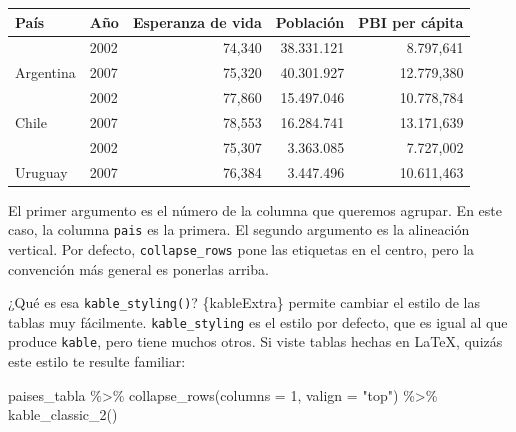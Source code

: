 \documentclass[
  openany]{book}
\newenvironment{Shaded}{\begin{snugshade}}{\end{snugshade}}
\newcommand{\AttributeTok}[1]{\textcolor[rgb]{0.77,0.63,0.00}{#1}}
\newcommand{\DecValTok}[1]{\textcolor[rgb]{0.00,0.00,0.81}{#1}}
\newcommand{\FunctionTok}[1]{\textcolor[rgb]{0.00,0.00,0.00}{#1}}
\newcommand{\NormalTok}[1]{#1}
\newcommand{\SpecialCharTok}[1]{\textcolor[rgb]{0.00,0.00,0.00}{#1}}
\newcommand{\StringTok}[1]{\textcolor[rgb]{0.31,0.60,0.02}{#1}}
\begin{document}
\begin{table}
\centering
\begin{tabular}{l|l|r|r|r}
\hline
País & Año & Esperanza de vida & Población & PBI per cápita\\
\hline
 & 2002 & 74,340 & 38.331.121 & 8.797,641\\
\cline{2-5}
\multirow[t]{-2}{*}{\raggedright\arraybackslash Argentina} & 2007 & 75,320 & 40.301.927 & 12.779,380\\
\cline{1-5}
 & 2002 & 77,860 & 15.497.046 & 10.778,784\\
\cline{2-5}
\multirow[t]{-2}{*}{\raggedright\arraybackslash Chile} & 2007 & 78,553 & 16.284.741 & 13.171,639\\
\cline{1-5}
 & 2002 & 75,307 & 3.363.085 & 7.727,002\\
\cline{2-5}
\multirow[t]{-2}{*}{\raggedright\arraybackslash Uruguay} & 2007 & 76,384 & 3.447.496 & 10.611,463\\
\hline
\end{tabular}
\end{table}

El primer argumento es el número de la columna que queremos agrupar.
En este caso, la columna \texttt{pais} es la primera.
El segundo argumento es la alineación vertical.
Por defecto, \texttt{collapse\_rows} pone las etiquetas en el centro, pero la convención más general es ponerlas arriba.

¿Qué es esa \texttt{kable\_styling()}?
\{kableExtra\} permite cambiar el estilo de las tablas muy fácilmente.
\texttt{kable\_styling} es el estilo por defecto, que es igual al que produce \texttt{kable}, pero tiene muchos otros.
Si viste tablas hechas en LaTeX, quizás este estilo te resulte familiar:

\begin{Shaded}
\begin{Highlighting}[]
\NormalTok{paises\_tabla }\SpecialCharTok{\%\textgreater{}\%} 
  \FunctionTok{collapse\_rows}\NormalTok{(}\AttributeTok{columns =} \DecValTok{1}\NormalTok{, }\AttributeTok{valign =} \StringTok{"top"}\NormalTok{)  }\SpecialCharTok{\%\textgreater{}\%} 
  \FunctionTok{kable\_classic\_2}\NormalTok{()}
\end{Highlighting}
\end{Shaded}
\end{document}
